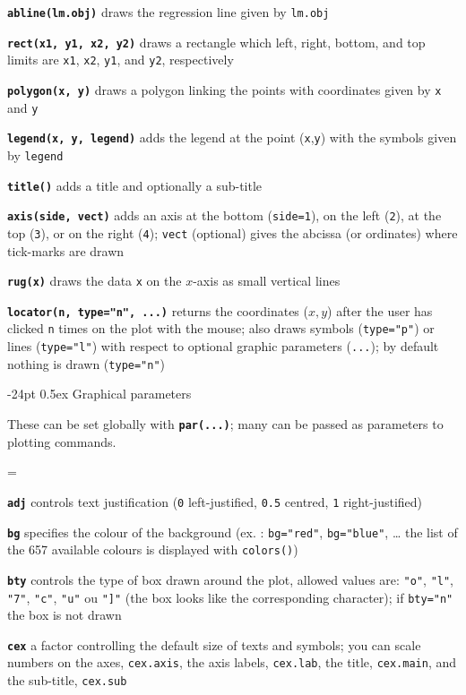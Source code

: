 \documentclass[10pt,landscape]{article}
\makeatletter
\renewcommand\section{\@startsection{section}{1}{0mm}%
                                     {-24pt}%
                                     {0.5ex}%
                                {\color{blue}\normalfont\large\bfseries}}
\newcommand{\code}{\texttt}
\newcommand{\bcode}[1]{\texttt{\textbf{#1}}}
\makeatother
\begin{document}
\begin{multicols*}{3}
\bcode{abline(lm.obj)}  draws the regression line given by \code{lm.obj}

\bcode{rect(x1, y1, x2, y2)}  draws a rectangle which left, right, bottom, and top limits are \code{x1}, \code{x2}, \code{y1}, and \code{y2}, respectively

\bcode{polygon(x, y)}  draws a polygon linking the points with coordinates given by \code{x} and \code{y}

\bcode{legend(x, y, legend)}  adds the legend at the point (\code{x},\code{y}) with the symbols given by \code{legend}

\bcode{title()}  adds a title and optionally a sub-title

\bcode{axis(side, vect)}  adds an axis at the bottom (\code{side=1}), on the left (\code{2}), at the top (\code{3}), or on the right (\code{4}); \code{vect} (optional) gives the abcissa (or ordinates) where tick-marks are drawn

\bcode{rug(x)}  draws the data \code{x} on the $x$-axis as small vertical lines

\bcode{locator(n, type="n", ...)}  returns the coordinates ($x,y$) after the user has clicked \code{n} times on the plot with the mouse; also draws symbols (\code{type="p"}) or lines (\code{type="l"}) with respect to optional graphic parameters (\code{...}); by default nothing is drawn (\code{type="n"})




\section{Graphical parameters}

These can be set globally with \bcode{par(...)}; many can be passed as
parameters to plotting commands.

\everypar={\hangindent=9mm}

\bcode{adj}  controls text justification (\code{0} left-justified, \code{0.5} centred, \code{1} right-justified)

\bcode{bg}  specifies the colour of the background (ex. : \code{bg="red"}, \code{bg="blue"}, \ldots{} the list of the 657 available colours is displayed with \code{colors()})

\bcode{bty}  controls the type of box drawn around the plot, allowed values are: \code{"o"}, \code{"l"}, \code{"7"}, \code{"c"}, \code{"u"} ou \code{"]"} (the box looks like the corresponding character); if \code{bty="n"} the box is not drawn

\bcode{cex}  a factor controlling the default size of texts and symbols; you can scale numbers on the axes, \code{cex.axis}, the axis labels, \code{cex.lab}, the title, \code{cex.main}, and the sub-title, \code{cex.sub}


\end{multicols*}
\end{document}
